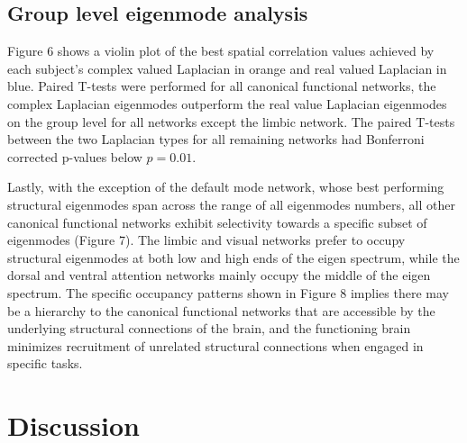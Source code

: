 \documentclass{article}
\begin{document}
\subsection{Group level eigenmode analysis}
Figure 6 shows a violin plot of the best spatial correlation values achieved by each subject's complex valued Laplacian in orange and real valued Laplacian in blue. Paired T-tests were performed for all canonical functional networks, the complex Laplacian eigenmodes outperform the real value Laplacian eigenmodes on the group level for all networks except the limbic network. The paired T-tests between the two Laplacian types for all remaining networks had Bonferroni corrected p-values below $p = 0.01$. 

Lastly, with the exception of the default mode network, whose best performing structural eigenmodes span across the range of all eigenmodes numbers, all other canonical functional networks exhibit selectivity towards a specific subset of eigenmodes (Figure 7). The limbic and visual networks prefer to occupy structural eigenmodes at both low and high ends of the eigen spectrum, while the dorsal and ventral attention networks mainly occupy the middle of the eigen spectrum. The specific occupancy patterns shown in Figure 8 implies there may be a hierarchy to the canonical functional networks that are accessible by the underlying structural connections of the brain, and the functioning brain minimizes recruitment of unrelated structural connections when engaged in specific tasks. 

\section{Discussion}

  
  
\end{document}
